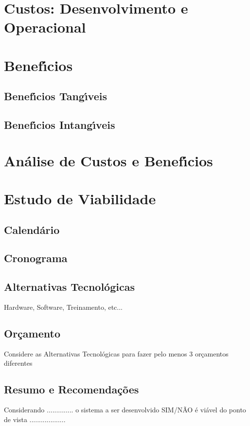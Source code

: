 \section{Custos: Desenvolvimento e Operacional}


\section{Benef\'{\i}cios}


       \subsection{Benef\'{\i}cios Tang\'{\i}veis}


       \subsection{Benef\'{\i}cios Intang\'{\i}veis}


\section{An\'{a}lise de Custos e Benef\'{\i}cios}





\section{Estudo de Viabilidade}


       \subsection{Calend\'{a}rio }

       \subsection{Cronograma }

       \subsection{Alternativas Tecnol\'{o}gicas }
        Hardware, Software, Treinamento, etc...

       \subsection{Or\c{c}amento }
       Considere as Alternativas Tecnol\'{o}gicas para fazer pelo menos 3 or\c{c}amentos diferentes



       \subsection{Resumo e Recomenda\c{c}\~{o}es}

       Considerando .............. o sistema a ser desenvolvido SIM/N\~{A}O \'{e} vi\'{a}vel do ponto de vista ...................
